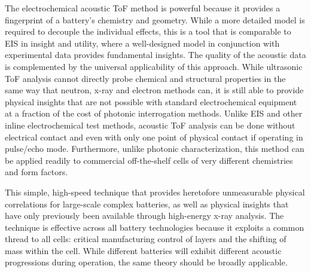 The electrochemical acoustic ToF method is powerful because it provides a fingerprint of a battery’s chemistry and geometry. While a more detailed model is required to decouple the individual effects, this is a tool that is comparable to EIS in insight and utility, where a well-designed model in conjunction with experimental data provides fundamental insights. The quality of the acoustic data is complemented by the universal applicability of this approach. While ultrasonic ToF analysis cannot directly probe chemical and structural properties in the same way that neutron, x-ray and electron methods can, it is still able to provide physical insights that are not possible with standard electrochemical equipment at a fraction of the cost of photonic interrogation methods. Unlike EIS and other inline electrochemical test methods, acoustic ToF analysis can be done without electrical contact and even with only one point of physical contact if operating in pulse/echo mode. Furthermore, unlike photonic characterization, this method can be applied readily to commercial off-the-shelf cells of very different chemistries and form factors. 

This simple, high-speed technique that provides heretofore unmeasurable physical correlations for large-scale complex batteries, as well as physical insights that have only previously been available through high-energy x-ray analysis. The technique is effective across all battery technologies because it exploits a common thread to all cells: critical manufacturing control of layers and the shifting of mass within the cell. While different batteries will exhibit different acoustic progressions during operation, the same theory should be broadly applicable.